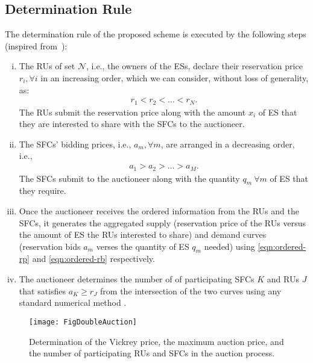 \documentclass[journal,10pt]{IEEEtran}
\begin{document}
\subsection{Determination Rule} The determination rule of the proposed scheme is executed by the following steps (inspired from~\cite{Huang-doubleauction:2002}):
\begin{enumerate}[i)]
\item The RUs of set $\mathcal{N}$, i.e., the owners of the ESs, declare their reservation price $r_i, \forall i$ in an increasing order, which we can consider, without loss of generality, as:
\begin{eqnarray}
r_1<r_2<\hdots<r_N.\label{eqn:ordered-rp}
\end{eqnarray}
The RUs submit the reservation price along with the amount $x_i$ of ES that they are interested to share with the SFCs to the auctioneer.
\item The SFCs' bidding prices, i.e., $a_m,\forall m$, are arranged in a decreasing order, i.e.,
\begin{eqnarray}
a_1>a_2>\hdots>a_M.\label{eqn:ordered-rb}
\end{eqnarray}
The SFCs submit to the auctioneer along with the quantity $q_m~\forall m$ of ES that they require.
\item Once the auctioneer receives the ordered information from the RUs and the SFCs, it generates the aggregated supply (reservation price of the RUs versus the amount of ES the RUs interested to share) and demand curves (reservation bids $a_m$ verses the quantity of ES $q_m$ needed) using \eqref{eqn:ordered-rp} and \eqref{eqn:ordered-rb} respectively.
\item The auctioneer determines the number of of participating SFCs $K$ and RUs $J$ that satisfies $a_K\geq r_J$ from the intersection of the two curves using any standard numerical method \cite{Huang-doubleauction:2002}.
\end{enumerate}
\begin{figure}[t!]
\centering
\texttt{[image: FigDoubleAuction]}
\caption{Determination of the Vickrey price, the maximum auction price, and the number of participating RUs and SFCs in the auction process.} \label{fig:doubleauction}
\end{figure}
\end{document}
